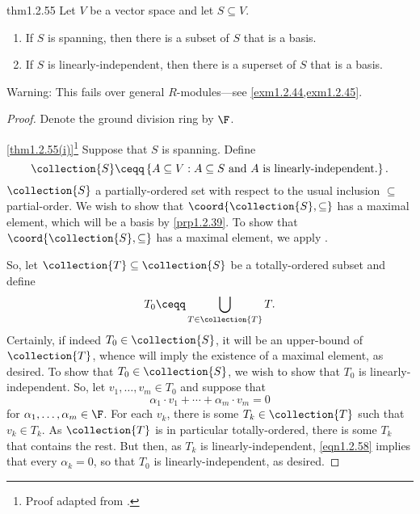 \begin{prp}{}{thm1.2.55}
	Let $V$ be a vector space and let $S\subseteq V$.
	\begin{enumerate}
		\item \label{thm1.2.55(i)}If $S$ is spanning, then there is a subset of $S$ that is a basis.
		\item \label{thm1.2.55(ii)}If $S$ is linearly-independent, then there is a superset of $S$ that is a basis.
	\end{enumerate}
	\begin{rmk}
		Warning:  This fails over general $R$-modules---see \cref{exm1.2.44,exm1.2.45}.
	\end{rmk}
	\begin{proof}
		Denote the ground division ring by $\F$.
		
		\blni
		\cref{thm1.2.55(i)}\footnote{Proof adapted from \cite{Conrad}.} Suppose that $S$ is spanning.  Define
		\begin{equation}
			\collection{S}\ceqq \left\{ A\subseteq V:A\subseteq S\text{ and }A\text{ is linearly-independent.}\right\} .
		\end{equation}
		$\collection{S}$ a partially-ordered set with respect to the usual inclusion $\subseteq$ partial-order.  We wish to show that $\coord{\collection{S},\subseteq}$ has a maximal element, which will be a basis by \cref{prp1.2.39}.  To show that $\coord{\collection{S},\subseteq}$ has a maximal element, we apply .
		
		So, let $\collection{T}\subseteq \collection{S}$ be a totally-ordered subset and define
		\begin{equation}
			T_0\ceqq \bigcup _{T\in \collection{T}}T.
		\end{equation}
		Certainly, if indeed $T_0\in \collection{S}$, it will be an upper-bound of $\collection{T}$, whence  will imply the existence of a maximal element, as desired.  To show that $T_0\in \collection{S}$, we wish to show that $T_0$ is linearly-independent.  So, let $v_1,\ldots ,v_m\in T_0$ and suppose that
		\begin{equation}\label{eqn1.2.58}
			\alpha _1\cdot v_1+\cdots +\alpha _m\cdot v_m=0
		\end{equation}
		for $\alpha _1,\ldots ,\alpha _m\in \F$.  For each $v_k$, there is some $T_k\in \collection{T}$ such that $v_k\in T_k$.  As $\collection{T}$ is in particular totally-ordered, there is some $T_k$ that contains the rest.  But then, as $T_k$ is linearly-independent, \eqref{eqn1.2.58} implies that every $\alpha _k=0$, so that $T_0$ is linearly-independent, as desired.
		

\end{proof}
\end{prp}
